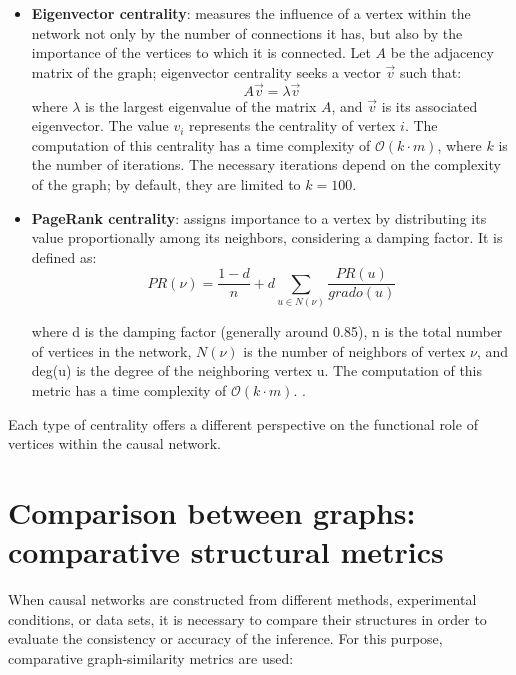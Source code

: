 \documentclass[12pt,a4paper]{report}
\begin{document}
\begin{itemize}
	\item \textbf{Eigenvector centrality}: measures the influence of a vertex within the network not only by the number of connections it has, but also by the importance of the vertices to which it is connected. Let \( A \) be the adjacency matrix of the graph; eigenvector centrality seeks a vector \( \vec{v} \) such that:
\begin{equation}
A \vec{v} = \lambda \vec{v}
\end{equation}
where \( \lambda \) is the largest eigenvalue of the matrix \( A \), and \( \vec{v} \) is its associated eigenvector. The value \( v_i \) represents the centrality of vertex \( i \).
The computation of this centrality has a time complexity of \( \mathcal{O}(k \cdot m) \), where $k$ is the number of iterations. The necessary iterations depend on the complexity of the graph; by default, they are limited to $k=100$.

    \item \textbf{PageRank centrality}: assigns importance to a vertex by distributing its value proportionally among its neighbors, considering a damping factor. It is defined as:
\begin{equation}
PR(\nu) = \frac{1 - d}{n} + d \sum_{u \in N(\nu)} \frac{PR(u)}{grado(u)}
\end{equation}

    where d is the damping factor (generally around 0.85), n is the total number of vertices in the network, $ N (\nu) $ is the number of neighbors of vertex $ \nu $, and deg(u) is the degree of the neighboring vertex u. The computation of this metric has a time complexity of \( \mathcal{O}(k \cdot m) \).  .
\end{itemize}

Each type of centrality offers a different perspective on the functional role of vertices within the causal network.

\section{Comparison between graphs: comparative structural metrics}

When causal networks are constructed from different methods, experimental conditions, or data sets, it is necessary to compare their structures in order to evaluate the consistency or accuracy of the inference. For this purpose, comparative graph-similarity metrics are used:
\end{document}
